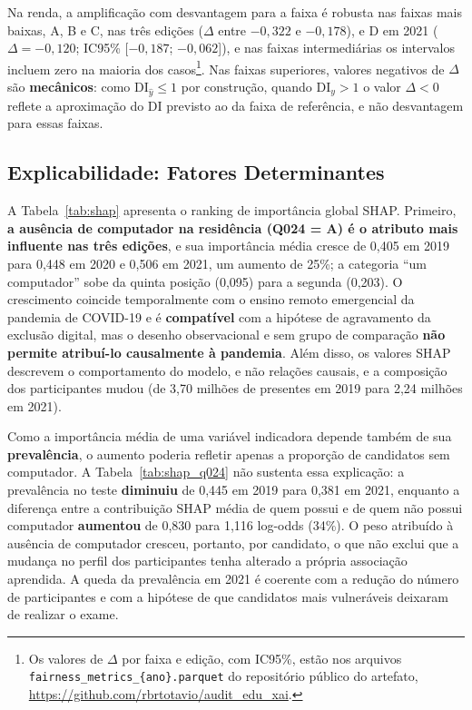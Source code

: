 Na renda, a amplificação com desvantagem para a faixa é robusta nas faixas mais baixas, A, B e C, nas três edições ($\Delta$ entre $-0{,}322$ e $-0{,}178$), e D em 2021 ($\Delta = -0{,}120$; IC95\% [$-0{,}187$; $-0{,}062$]), e nas faixas intermediárias os intervalos incluem zero na maioria dos casos\footnote{\raggedright Os valores de $\Delta$ por faixa e edição, com IC95\%, estão nos arquivos \texttt{fairness\_metrics\_\{ano\}.parquet} do repositório público do artefato, \url{https://github.com/rbrtotavio/audit_edu_xai}.}. Nas faixas superiores, valores negativos de $\Delta$ são \textbf{mecânicos}: como $\mathrm{DI}_{\hat{y}} \leq 1$ por construção, quando $\mathrm{DI}_y > 1$ o valor $\Delta < 0$ reflete a aproximação do DI previsto ao da faixa de referência, e não desvantagem para essas faixas.

\subsection{Explicabilidade: Fatores Determinantes}
\label{sec:res_shap}

A Tabela~\ref{tab:shap} apresenta o ranking de importância global SHAP. Primeiro, \textbf{a ausência de computador na residência (Q024 = A) é o atributo mais influente nas três edições}, e sua importância média cresce de 0,405 em 2019 para 0,448 em 2020 e 0,506 em 2021, um aumento de 25\%; a categoria ``um computador'' sobe da quinta posição (0,095) para a segunda (0,203). O crescimento coincide temporalmente com o ensino remoto emergencial da pandemia de COVID-19 e é \textbf{compatível} com a hipótese de agravamento da exclusão digital, mas o desenho observacional e sem grupo de comparação \textbf{não permite atribuí-lo causalmente à pandemia}. Além disso, os valores SHAP descrevem o comportamento do modelo, e não relações causais, e a composição dos participantes mudou (de 3,70 milhões de presentes em 2019 para 2,24 milhões em 2021).



Como a importância média de uma variável indicadora depende também de sua \textbf{prevalência}, o aumento poderia refletir apenas a proporção de candidatos sem computador. A Tabela~\ref{tab:shap_q024} não sustenta essa explicação: a prevalência no teste \textbf{diminuiu} de 0,445 em 2019 para 0,381 em 2021, enquanto a diferença entre a contribuição SHAP média de quem possui e de quem não possui computador \textbf{aumentou} de 0,830 para 1,116 log-odds (34\%). O peso atribuído à ausência de computador cresceu, portanto, por candidato, o que não exclui que a mudança no perfil dos participantes tenha alterado a própria associação aprendida. A queda da prevalência em 2021 é coerente com a redução do número de participantes e com a hipótese de que candidatos mais vulneráveis deixaram de realizar o exame.

